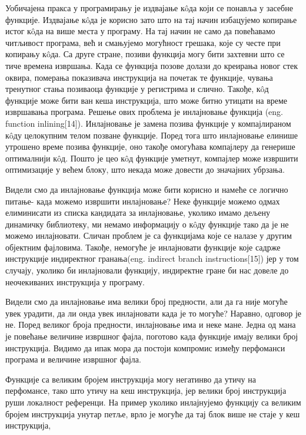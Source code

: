 \documentclass[12pt,oneside]{memoir}
\begin{document}
Уобичајена пракса у програмирању је издвајање к\^{o}да који се понавља у 
засебне функције.
Издвајање к\^{o}да је корисно зато што на тај начин избацујемо копирање
истог к\^{o}да на више места у програму.
На тај начин не само да повећавамо читљивост програма, већ и смањујемо
могућност грешака, које су честе при копирању  к\^{o}да.
Са друге стране, позиви функција могу бити захтевни што се тиче времена извршања.
Када се функција позове долази до креирања новог стек оквира, померања показивача
инструкција на почетак те функције, чувања тренутног стања позиваоца функције у 
регистрима и слично.
Такође,  к\^{o}д функције може бити ван кеша инструкција, што може битно
утицати на време извршавања програма.
Решење ових проблема је инлајновање функција (eng. function inlining[14]).
Инлајновање је замена позива функције у компајлираном к\^{o}ду
целокупним телом позване функције.
Поред тога што инлајновање елинише утрошено време позива функције, оно такође
омогућава компајлеру да генерише оптималнији к\^{o}д.
Пошто је цео к\^{o}д функције уметнут, компајлер може извршити оптимизације у већем
блоку, што некада може довести до значајних убрзања.
\par
Видели смо да инлајновање функција може бити корисно и намеће се логично питање-
када можемо извршити инлајновање?
Неке функције можемо одмах елиминисати из списка кандидата за инлајновање, уколико имамо дељену динамичку библиотеку, ми немамо
информацију о к\^{o}ду функције тако да је не можемо инлајновати.
Сличан проблем је са функцијама које се налазе у другим објектним фајловима.
Такође, немогуће је инлајновати функције које садрже инструкције индиректног
гранања(eng. indirect branch instructions[15]) јер у том случају, уколико би 
инлајновали функцију, индиректне гране би нас довеле до неочекиваних инструкција
у програму.
\par 
Видели смо да инлајновање има велики број предности, али да га није могуће увек
урадити, да ли онда увек инлајновати када је то могуће?
Наравно, одговор је не. 
Поред великог броја предности, инлајновање има и неке мане.
Једна од мана је повећање величине извршног фајла, поготово када функције имају
велики број инструкција.
Видимо да ипак мора да постоји компромис између перфоманси програма и величине
извршног фајла.
\par
Функције са великим бројем инструкција могу негатинво да утичу на перфомансе, тако
што утичу на кеш инструкција, јер велики број инструкција руши локалност референци. 
На пример уколико инлајнујемо функцију са великим бројем инструкција 
унутар петље, врло је могуће да тај блок више не стаје у кеш инструкција,
\end{document}
